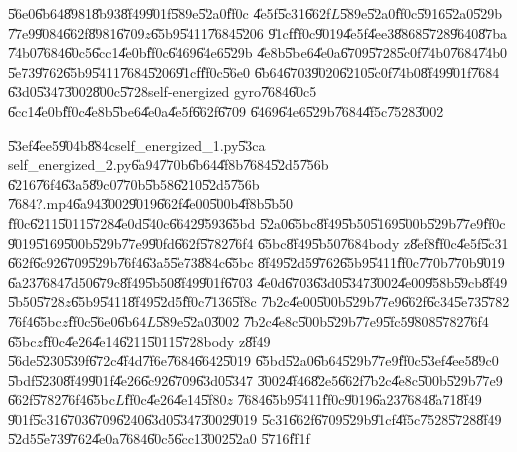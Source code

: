 \bigskip

\U{56e0}\U{6b64}\U{8981}\U{8b93}\U{8f49}\U{901f}\U{589e}\U{52a0}\U{ff0c}%
\U{4e5f}\U{5c31}\U{662f}$L$\U{589e}\U{52a0}\U{ff0c}\U{5916}\U{52a0}\U{529b}%
\U{77e9}\U{9084}\U{662f}\U{8981}\U{6709}$z$\U{65b9}\U{5411}\U{7684}\U{5206}%
\U{91cf}\U{ff0c}\U{9019}\U{4e5f}\U{4ee3}\U{8868}\U{5728}\U{9640}\U{87ba}%
\U{74b0}\U{7684}\U{60c5}\U{6cc1}\U{4e0b}\U{ff0c}\U{6469}\U{64e6}\U{529b}%
\U{4e8b}\U{5be6}\U{4e0a}\U{6709}\U{5728}\U{5c0f}\U{74b0}\U{7684}\U{74b0}%
\U{5e73}\U{9762}\U{65b9}\U{5411}\U{7684}\U{5206}\U{91cf}\U{ff0c}\U{56e0}%
\U{6b64}\U{6703}\U{9020}\U{6210}\U{5c0f}\U{74b0}\U{8f49}\U{901f}\U{7684}%
\U{63d0}\U{5347}\U{3002}\U{800c}\U{5728}self-energized gyro\U{7684}\U{60c5}%
\U{6cc1}\U{4e0b}\U{ff0c}\U{4e8b}\U{5be6}\U{4e0a}\U{4e5f}\U{662f}\U{6709}%
\U{6469}\U{64e6}\U{529b}\U{7684}\U{4f5c}\U{7528}\U{3002}

\bigskip

\U{53ef}\U{4ee5}\U{904b}\U{884c}self\_energized\_1.py\U{53ca}%
self\_energized\_2.py\U{6a94}\U{770b}\U{6b64}\U{4f8b}\U{7684}\U{52d5}\U{756b}%
\U{6216}\U{76f4}\U{63a5}\U{89c0}\U{770b}\U{5b58}\U{6210}\U{52d5}\U{756b}%
\U{7684}?.mp4\U{6a94}\U{3002}\U{9019}\U{662f}\U{4e00}\U{500b}\U{4f8b}\U{5b50}%
\U{ff0c}\U{6211}\U{5011}\U{5728}\U{4e0d}\U{540c}\U{6642}\U{9593}\U{65bd}%
\U{52a0}\U{65bc}\U{8f49}\U{5b50}\U{5169}\U{500b}\U{529b}\U{77e9}\U{ff0c}%
\U{9019}\U{5169}\U{500b}\U{529b}\U{77e9}\U{90fd}\U{662f}\U{5782}\U{76f4}%
\U{65bc}\U{8f49}\U{5b50}\U{7684}body z\U{8ef8}\U{ff0c}\U{4e5f}\U{5c31}%
\U{662f}\U{6c92}\U{6709}\U{529b}\U{76f4}\U{63a5}\U{5e73}\U{884c}\U{65bc}%
\U{8f49}\U{52d5}\U{9762}\U{65b9}\U{5411}\U{ff0c}\U{770b}\U{770b}\U{9019}%
\U{6a23}\U{7684}\U{7d50}\U{679c}\U{8f49}\U{5b50}\U{8f49}\U{901f}\U{6703}%
\U{4e0d}\U{6703}\U{63d0}\U{5347}\U{3002}\U{4e00}\U{958b}\U{59cb}\U{8f49}%
\U{5b50}\U{5728}$z$\U{65b9}\U{5411}\U{8f49}\U{52d5}\U{ff0c}\U{7136}\U{5f8c}%
\U{7b2c}\U{4e00}\U{500b}\U{529b}\U{77e9}\U{662f}\U{6c34}\U{5e73}\U{5782}%
\U{76f4}\U{65bc}$z$\U{ff0c}\U{56e0}\U{6b64}$L$\U{589e}\U{52a0}\U{3002}%
\U{7b2c}\U{4e8c}\U{500b}\U{529b}\U{77e9}\U{5fc5}\U{9808}\U{5782}\U{76f4}%
\U{65bc}$z$\U{ff0c}\U{4e26}\U{4e14}\U{6211}\U{5011}\U{5728}body z\U{8f49}%
\U{56de}\U{5230}\U{539f}\U{672c}\U{4f4d}\U{7f6e}\U{7684}\U{6642}\U{5019}%
\U{65bd}\U{52a0}\U{6b64}\U{529b}\U{77e9}\U{ff0c}\U{53ef}\U{4ee5}\U{89c0}%
\U{5bdf}\U{5230}\U{8f49}\U{901f}\U{4e26}\U{6c92}\U{6709}\U{63d0}\U{5347}%
\U{3002}\U{4f46}\U{82e5}\U{662f}\U{7b2c}\U{4e8c}\U{500b}\U{529b}\U{77e9}%
\U{662f}\U{5782}\U{76f4}\U{65bc}$L$\U{ff0c}\U{4e26}\U{4e14}\U{5f80}$z$%
\U{7684}\U{65b9}\U{5411}\U{ff0c}\U{9019}\U{6a23}\U{7684}\U{8a71}\U{8f49}%
\U{901f}\U{5c31}\U{6703}\U{6709}\U{6240}\U{63d0}\U{5347}\U{3002}\U{9019}%
\U{5c31}\U{662f}\U{6709}\U{529b}\U{91cf}\U{4f5c}\U{7528}\U{5728}\U{8f49}%
\U{52d5}\U{5e73}\U{9762}\U{4e0a}\U{7684}\U{60c5}\U{6cc1}\U{3002}\U{52a0}%
\U{5716}\U{ff1f}

